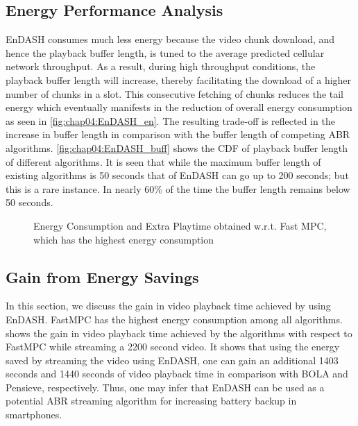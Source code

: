 \subsection{Energy Performance Analysis}
EnDASH consumes much less energy because the video chunk download, and hence the playback buffer length, is tuned to the average predicted cellular network throughput. As a result, during high throughput conditions, the playback buffer length will increase, thereby facilitating the download of a higher number of chunks in a slot. This consecutive fetching of chunks reduces the tail energy which eventually manifests in the reduction of overall energy consumption as seen in \fig\ref{fig:chap04:EnDASH_en}. The resulting trade-off is reflected in the increase in buffer length in comparison with the buffer length of competing \ac{ABR} algorithms.  \fig\ref{fig:chap04:EnDASH_buff} shows the \ac{CDF} of playback buffer length of different algorithms. It is seen that while the maximum buffer length of existing algorithms is 50 seconds that of EnDASH can go up to 200 seconds; but this is a rare instance. In nearly 60\% of the time the buffer length remains below 50 seconds.

\begin{figure}[ht]%
	\centering
	{}
	\caption{Energy Consumption and Extra Playtime obtained w.r.t. Fast MPC, which has the highest energy consumption}\vspace*{-0.5cm}
	\label{fig:chap04:vid_time_save}
\end{figure}
\subsection{Gain from Energy Savings}
\indent In this section, we discuss the gain in video playback time achieved by using EnDASH. FastMPC has the highest energy consumption among all algorithms. \fig{\ref{fig:chap04:vid_time_save}} shows the gain in video playback time achieved by the algorithms with respect to FastMPC while streaming a 2200 second video. It shows that using the energy saved by streaming the video using EnDASH, one can gain an additional 1403 seconds and 1440 seconds of video playback time in comparison with BOLA and Pensieve, respectively. Thus, one may infer that EnDASH can be used as a potential \ac{ABR} streaming algorithm for increasing battery backup in smartphones.

